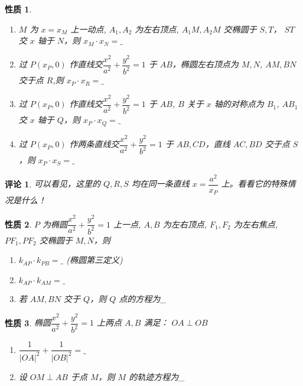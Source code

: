 \documentclass[a4paper,10pt,twoside]{article}
\newtheorem{remark}{评论}
\newtheorem{proposition}{性质}
\begin{document}
\begin{proposition}
    \begin{enumerate}[ $ (1) $ ]
        \item  $ M  $ 为 $ x=x_M  $ 上一动点,  $ A_1,A_2  $ 为左右顶点, $ A_1M,A_2M  $ 交椭圆于 $ S,T  $， $ ST $ 交 $ x  $ 轴于  $ N  $，则 $ x_M\cdot x_N=\_ $
        \item 过 $ P(x_P,0) $ 作直线交$ \dfrac{x^2}{a^2}+\dfrac{y^2}{b^2}=1 $ 于 $ AB  $，椭圆左右顶点为 $ M,N  $,  $ AM,BN  $ 交于点 $ R  $,则 $ x_P\cdot x_R=\_  $
        \item       过 $ P(x_P,0) $ 作直线交$ \dfrac{x^2}{a^2}+\dfrac{y^2}{b^2}=1 $ 于 $ AB  $, $ B  $ 关于 $ x  $ 轴的对称点为 $ B_1 $, $ AB_1  $ 交 $ x  $ 轴于 $ Q  $，则 $ x_P\cdot x_Q=\_  $
        \item 过 $ P(x_P,0) $ 作两条直线交$ \dfrac{x^2}{a^2}+\dfrac{y^2}{b^2}=1 $ 于 $ AB,CD  $，直线 $ AC,BD  $ 交于点 $ S  $，则 $ x_P\cdot x_S=\_ $  
    \end{enumerate}
\end{proposition}
\begin{remark}
    可以看见，这里的 $ Q,R,S $ 均在同一条直线 $ x=\dfrac{a^2}{x_P} $ 上。看看它的特殊情况是什么！
\end{remark}
\begin{proposition}
     $ P  $ 为椭圆$ \dfrac{x^2}{a^2}+\dfrac{y^2}{b^2}=1 $ 上一点, $ A,B  $ 为左右顶点, $ F_1,F_2  $ 为左右焦点, $ PF_1,PF_2  $ 交椭圆于 $ M,N  $，则
     \begin{enumerate}[ $ (1) $ ]
        \item  $ k_{AP }\cdot k_{PB}=\_ $ \quad (椭圆第三定义)
        \item  $ k_{AP}\cdot k_{AM }=\_ $
        \item 若 $ AM,BN  $ 交于 $ Q  $，则 $ Q  $ 点的方程为\_  
     \end{enumerate}
\end{proposition}
\begin{proposition}
    椭圆$ \dfrac{x^2}{a^2}+\dfrac{y^2}{b^2}=1 $ 上两点 $ A,B  $ 满足： $ OA\perp OB  $
    \begin{enumerate}
        \item[ $ (1) $ ]  $ \dfrac{1}{|OA|^2}+\dfrac{1}{|OB|^2}=\_ $
        \item[ $ (2) $ ] 设 $ OM\perp AB  $ 于点 $ M  $，则 $ M  $ 的轨迹方程为\_  
    \end{enumerate} 
\end{proposition}
\end{document}
